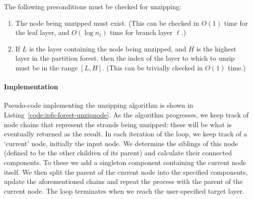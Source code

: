 The following preconditions must be checked for unzipping:

\begin{enumerate}

\item The node being unzipped must exist. (This can be checked in $O(1)$ time for the leaf layer, and $O(\log n_\ell)$ time for branch layer $\ell$.)
\item If $L$ is the layer containing the node being unzipped, and $H$ is the highest layer in the partition forest, then the index of the layer to which to unzip must be in the range $[L,H]$. (This can be trivially checked in $O(1)$ time.)

\end{enumerate}

\paragraph{Implementation}

\enlargethispage*{\baselineskip}

Pseudo-code implementing the unzipping algorithm is shown in Listing~\ref{code:ipfs-forest-unzipnode}. As the algorithm progresses, we keep track of node chains that represent the strands being unzipped: these will be what is eventually returned as the result. In each iteration of the loop, we keep track of a `current' node, initially the input node. We determine the siblings of this node (defined to be the other children of its parent) and calculate their connected components. To these we add a singleton component containing the current node itself. We then split the parent of the current node into the specified components, update the aforementioned chains and repeat the process with the parent of the current node. The loop terminates when we reach the user-specified target layer.

